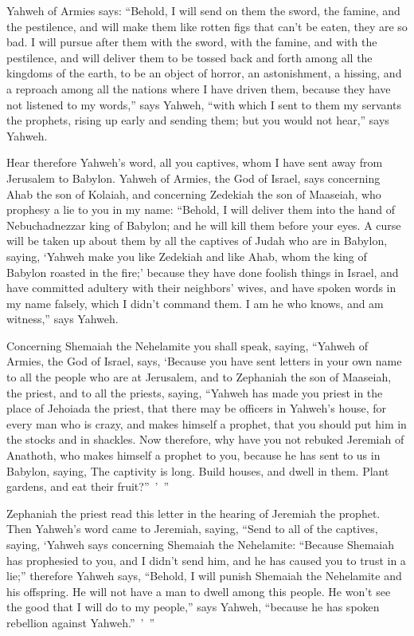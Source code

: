 {Yahweh of Armies says: “Behold, I will send on them the sword, the famine, and the pestilence, and will make them like rotten figs that can’t be eaten, they are so bad.
I will pursue after them with the sword, with the famine, and with the pestilence, and will deliver them to be tossed back and forth among all the kingdoms of the earth, to be an object of horror, an astonishment, a hissing, and a reproach among all the nations where I have driven them,
because they have not listened to my words,” says Yahweh, “with which I sent to them my servants the prophets, rising up early and sending them; but you would not hear,” says Yahweh.
\par }{\PI {}Hear therefore Yahweh’s word, all you captives, whom I have sent away from Jerusalem to Babylon.
Yahweh of Armies, the God of Israel, says concerning Ahab the son of Kolaiah, and concerning Zedekiah the son of Maaseiah, who prophesy a lie to you in my name: “Behold, I will deliver them into the hand of Nebuchadnezzar king of Babylon; and he will kill them before your eyes.
A curse will be taken up about them by all the captives of Judah who are in Babylon, saying, ‘Yahweh make you like Zedekiah and like Ahab, whom the king of Babylon roasted in the fire;’
because they have done foolish things in Israel, and have committed adultery with their neighbors’ wives, and have spoken words in my name falsely, which I didn’t command them. I am he who knows, and am witness,” says Yahweh.
\par }{\PP {}Concerning Shemaiah the Nehelamite you shall speak, saying,
“Yahweh of Armies, the God of Israel, says, ‘Because you have sent letters in your own name to all the people who are at Jerusalem, and to Zephaniah the son of Maaseiah, the priest, and to all the priests, saying,
“Yahweh has made you priest in the place of Jehoiada the priest, that there may be officers in Yahweh’s house, for every man who is crazy, and makes himself a prophet, that you should put him in the stocks and in shackles.
Now therefore, why have you not rebuked Jeremiah of Anathoth, who makes himself a prophet to you,
because he has sent to us in Babylon, saying, The captivity is long. Build houses, and dwell in them. Plant gardens, and eat their fruit?” ’ ”
\par }{\PP {}Zephaniah the priest read this letter in the hearing of Jeremiah the prophet.
Then Yahweh’s word came to Jeremiah, saying,
“Send to all of the captives, saying, ‘Yahweh says concerning Shemaiah the Nehelamite: “Because Shemaiah has prophesied to you, and I didn’t send him, and he has caused you to trust in a lie;”
therefore Yahweh says, “Behold, I will punish Shemaiah the Nehelamite and his offspring. He will not have a man to dwell among this people. He won’t see the good that I will do to my people,” says Yahweh, “because he has spoken rebellion against Yahweh.” ’ ”

}

